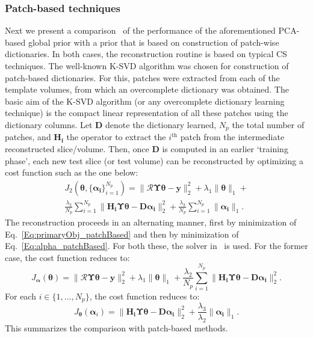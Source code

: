 \documentclass[journal]{IEEEtran}
\begin{document}
\subsubsection{\textbf{Patch-based techniques}}
\label{sec:patch_based}
Next we present a comparison~\cite{my_dicta_paper} of the performance of the aforementioned PCA-based global prior with a prior that is based on construction of patch-wise dictionaries. In both cases, the reconstruction routine is based on typical CS techniques. The well-known K-SVD algorithm \cite{Aharon2006} was chosen for construction of patch-based dictionaries. For this, patches were extracted from each of the template volumes, from which an overcomplete dictionary was obtained. The basic aim of the K-SVD algorithm (or any overcomplete dictionary learning technique) is the compact linear representation of all these patches using the dictionary columns. Let $\boldsymbol{D}$ denote the dictionary learned, $N_p$ the total number of patches, and $\boldsymbol{H_i}$ the operator to extract the $i^{\textrm{th}}$ patch from the intermediate reconstructed slice/volume. Then, once $\boldsymbol{D}$ is computed in an earlier `training phase', each new test slice (or test volume) can be reconstructed by optimizing a cost function such as the one below:
\begin{multline}
J_2(\boldsymbol{\theta},\{\boldsymbol{\alpha_i}\}_{i=1}^{N_p}) = \lVert\boldsymbol{\mathcal{R}\Upsilon\theta}- \boldsymbol{y}\rVert_2^2  + \lambda_1\lVert\boldsymbol{\theta}\rVert_1 + \\ \frac{\lambda_2}{N_p}\sum_{i=1}^{N_p}\lVert \boldsymbol{H_i\Upsilon \theta}-\boldsymbol{D \alpha_i}\rVert_2^2 +\frac{\lambda_3}{ N_p}\sum_{i=1}^{N_p}\lVert\boldsymbol{\alpha_i}\rVert_1.
\label{Eq:main_patchBased}
\end{multline}
The reconstruction proceeds in an alternating manner, first by minimization of Eq.~\ref{Eq:primaryObj_patchBased} and then by minimization of Eq.~\ref{Eq:alpha_patchBased}. For both these, the solver in~\cite{l1ls} is used. For the former case, the cost function reduces to:
\begin{equation}
J_{\boldsymbol{\alpha}}(\boldsymbol{\theta}) = \lVert \boldsymbol{\mathcal{R} \Upsilon \theta}- \boldsymbol{y}\rVert_2^2  + \lambda_1\lVert\boldsymbol{\theta}\rVert_1 + \frac{\lambda_2}{N_p}\sum_{i=1}^{N_p}\rVert \boldsymbol{H_i \Upsilon \theta}-\boldsymbol{D \alpha_i}\rVert_2^2.
\label{Eq:primaryObj_patchBased}
\end{equation}
For each $i \in \{1,...,N_p\}$, the cost function reduces to:
\begin{equation}
J_{\boldsymbol{\theta}}(\boldsymbol{\alpha}_i) =  \lVert \boldsymbol{H_i \Upsilon \theta}-\boldsymbol{D\alpha_i}\rVert_2^2  + \frac{\lambda_3}{\lambda_2}\lVert\boldsymbol{\alpha_i}\rVert_1.
\label{Eq:alpha_patchBased}
\end{equation}
This summarizes the comparison with patch-based methods.
\end{document}
